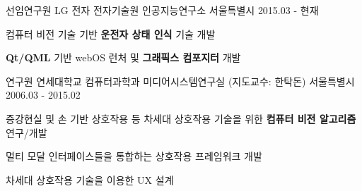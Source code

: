 


\begin{cventries}

  \cventry
    {선임연구원} %
    {LG 전자 전자기술원 인공지능연구소} %
    {서울특별시} %
    {2015.03 - 현재} %
    {
      \begin{cvitems} %
        \item {컴퓨터 비전 기술 기반 \textbf{운전자 상태 인식} 기술 개발}
        \item {\textbf{Qt/QML} 기반 webOS 런처 및 \textbf{그래픽스 컴포지터} 개발}
      \end{cvitems}
    }


  \cventry
    {연구원} %
    {연세대학교 컴퓨터과학과 미디어시스템연구실 (지도교수: 한탁돈)} %
    {서울특별시} %
    {2006.03 - 2015.02} %
    {
      \begin{cvitems} %
        \item {증강현실 및 손 기반 상호작용 등 차세대 상호작용 기술을 위한 \textbf{컴퓨터 비전 알고리즘} 연구/개발}
        \item {멀티 모달 인터페이스들을 통합하는 상호작용 프레임워크 개발}
        \item {차세대 상호작용 기술을 이용한 UX 설계}
      \end{cvitems}
    }

\end{cventries}
